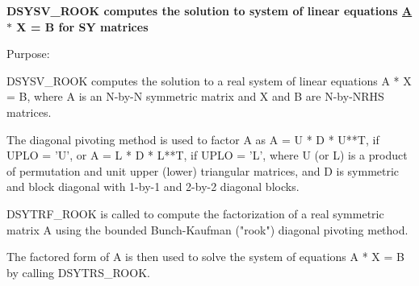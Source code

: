 {\bfseries  D\+S\+Y\+S\+V\+\_\+\+R\+O\+O\+K computes the solution to system of linear equations \hyperlink{classA}{A} $\ast$ X = B for S\+Y matrices} 

 \begin{DoxyParagraph}{Purpose\+: }
\begin{DoxyVerb} DSYSV_ROOK computes the solution to a real system of linear
 equations
    A * X = B,
 where A is an N-by-N symmetric matrix and X and B are N-by-NRHS
 matrices.

 The diagonal pivoting method is used to factor A as
    A = U * D * U**T,  if UPLO = 'U', or
    A = L * D * L**T,  if UPLO = 'L',
 where U (or L) is a product of permutation and unit upper (lower)
 triangular matrices, and D is symmetric and block diagonal with
 1-by-1 and 2-by-2 diagonal blocks.

 DSYTRF_ROOK is called to compute the factorization of a real
 symmetric matrix A using the bounded Bunch-Kaufman ("rook") diagonal
 pivoting method.

 The factored form of A is then used to solve the system 
 of equations A * X = B by calling DSYTRS_ROOK.\end{DoxyVerb}
 
\end{DoxyParagraph}


